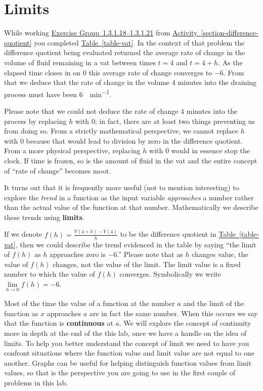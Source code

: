 \documentclass[12pt,]{book}
\newcommand{\terminology}[1]{\textbf{#1}}
\theoremstyle{plain}
\theoremstyle{definition}
\theoremstyle{definition}
\theoremstyle{definition}
\theoremstyle{definition}
\theoremstyle{definition}
\numberwithin{equation}{section}
\newcommand{\fe}[2]{#1\mathopen{}\left(#2\right)\mathclose{}}
\begin{document}
\section[{Limits}]{Limits}\label{section-limits}
While working \hyperlink{exercisegroup-vat}{Exercise Group~1.3.1.18--1.3.1.21} from \hyperref[section-difference-quotient]{Activity~\ref{section-difference-quotient}} you completed \hyperref[table-vat]{Table~\ref{table-vat}}. In the context of that problem the difference quotient being evaluated returned the average rate of change in the volume of fluid remaining in a vat between times \(t=4\) and \(t=4+h\). As the elapsed time closes in on \(0\) this average rate of change converges to \(-6\). From that we deduce that the rate of change in the volume \(4\) minutes into the draining process must have been \SI{6}{\gallon\per\minute}.%
\par
Please note that we could not deduce the rate of change \(4\) minutes into the process by replacing \(h\) with \(0\); in fact, there are at least two things preventing us from doing so. From a strictly mathematical perspective, we cannot replace \(h\) with \(0\) because that would lead to division by zero in the difference quotient. From a more physical perspective, replacing \(h\) with \(0\) would in essence stop the clock. If time is frozen, so is the amount of fluid in the vat and the entire concept of ``rate of change'' becomes moot.%
\par
It turns out that it is frequently more useful (not to mention interesting) to explore the \emph{trend} in a function as the input variable \emph{approaches} a number rather than the actual value of the function at that number. Mathematically we describe these trends using \terminology{limits}.%
\par
If we denote \(\fe{f}{h}=\frac{\fe{V}{4+h}-\fe{V}{4}}{h}\) to be the difference quotient in \hyperref[table-vat]{Table~\ref{table-vat}}, then we could describe the trend evidenced in the table by saying ``the limit of \(\fe{f}{h}\) as \(h\) approaches zero is \(-6\).'' Please note that as \(h\) changes value, the value of \(\fe{f}{h}\) changes, not the value of the limit. The limit value is a fixed number to which the value of \(\fe{f}{h}\) converges. Symbolically we write \(\lim\limits_{h\to0}\fe{f}{h}=-6\).%
\par
Most of the time the value of a function at the number \(a\) and the limit of the function as \(x\) approaches \(a\) are in fact the same number. When this occurs we say that the function is \terminology{continuous} at \(a\). We will explore the concept of continuity more in depth at the end of the this lab, once we have a handle on the idea of limits. To help you better understand the concept of limit we need to have you confront situations where the function value and limit value are not equal to one another. Graphs can be useful for helping distinguish function values from limit values, so that is the perspective you are going to use in the first couple of problems in this lab.%
\typeout{************************************************}
\typeout{************************************************}
\end{document}
